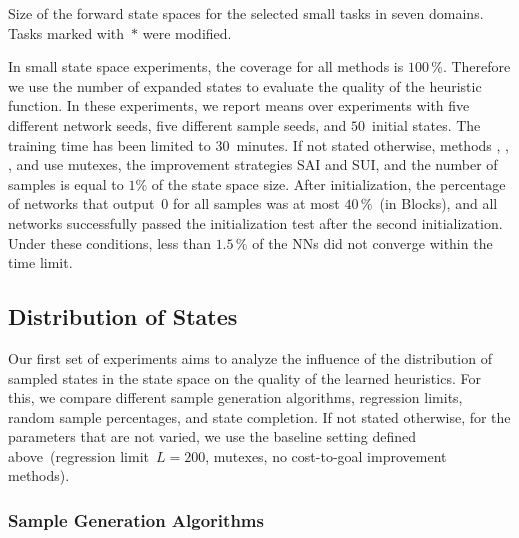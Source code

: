\begin{table}[ht]
    \caption[Size of the forward state spaces for the selected domains.]{Size of the forward state spaces for the selected small tasks in seven domains. Tasks marked with~$*$ were modified.} 
    \label{tab:small-fss-size}
    \addmargin
    \centering
    
\end{table}

In small state space experiments, the coverage for all methods is $100\,\%$. Therefore we use the number of expanded states to evaluate the quality of the heuristic function. In these experiments, we report means over experiments with five different network seeds, five different sample seeds, and $50$~initial states. The training time has been limited to $30$~minutes. If not stated otherwise, methods \bfs, \dfs, \rw, and \bfsrw use mutexes, the improvement strategies SAI and SUI, and the number of samples is equal to $1\%$ of the state space size. After initialization, the percentage of networks that output~$0$ for all samples was at most $40\,\%$~(in Blocks), and all networks successfully passed the initialization test after the second initialization. Under these conditions, less than $1.5\,\%$ of the NNs did not converge within the time limit.

\subsection{Distribution of States}
\label{sec:small-exps-distribution}

Our first set of experiments aims to analyze the influence of the distribution of sampled states in the state space on the quality of the learned heuristics. For this, we compare different sample generation algorithms, regression limits, random sample percentages, and state completion. If not stated otherwise, for the parameters that are not varied, we use the baseline setting defined above~(regression limit~$L=200$, mutexes, no cost-to-goal improvement methods).

\subsubsection{Sample Generation Algorithms}
\label{sec:small-exps-algorithm}

